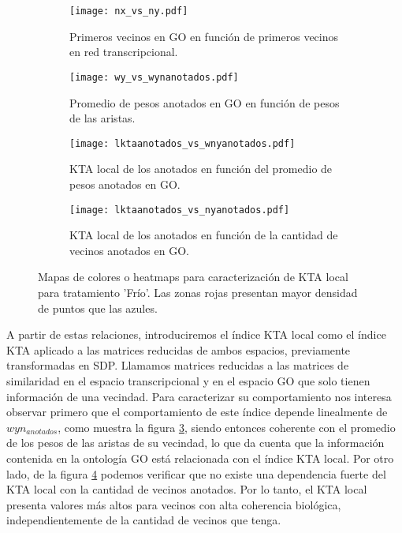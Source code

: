 \begin{sidewaysfigure}[t!]
    \centering
    \begin{subfigure}[t]{0.45\textwidth}
    \centering
    \texttt{[image: nx\_vs\_ny.pdf]}
    \caption{Primeros vecinos en GO en función de primeros vecinos en red transcripcional.}
    \label{fig:nx_vs_ny}
    \end{subfigure}    
    \begin{subfigure}[t]{0.45\textwidth}
    \centering
    \texttt{[image: wy\_vs\_wynanotados.pdf]}
    \caption{Promedio de pesos anotados en GO en función de pesos de las aristas.}
    \label{fig:wy_vs_wynanotados}
    \end{subfigure}    
    \begin{subfigure}[t]{0.45\textwidth}
    \centering
    \texttt{[image: lktaanotados\_vs\_wnyanotados.pdf]}
    \caption{KTA local de los anotados en función del promedio de pesos anotados en GO.}
    \label{fig:lktaanotados_vs_wnyanotados}
    \end{subfigure}    
    \begin{subfigure}[t]{0.45\textwidth}
    \centering
    \texttt{[image: lktaanotados\_vs\_nyanotados.pdf]}
    \caption{KTA local de los anotados en función de la cantidad de vecinos anotados en GO.}
    \label{fig:lktaanotados_vs_nyanotados}
    \end{subfigure}            
    \label{fig:ktalocal}
    \caption{Mapas de colores o heatmaps para caracterización de KTA local para tratamiento 'Frío'. Las zonas rojas presentan mayor densidad de puntos que las azules.}
\end{sidewaysfigure}

A partir de estas relaciones, introduciremos el índice KTA local como el índice KTA aplicado a las matrices reducidas de ambos espacios, previamente transformadas en SDP. Llamamos matrices reducidas a las matrices de similaridad en el espacio transcripcional y en el espacio GO que solo tienen información de una vecindad. Para caracterizar su comportamiento nos interesa observar primero que el comportamiento de este índice depende linealmente de $wyn_{anotados}$, como muestra la figura \ref{fig:lktaanotados_vs_wnyanotados}, siendo entonces coherente con el promedio de los pesos de las aristas de su vecindad, lo que da cuenta que la información contenida en la ontología GO está relacionada con el índice KTA local. Por otro lado, de la figura \ref{fig:lktaanotados_vs_nyanotados} podemos verificar que no existe una dependencia fuerte del KTA local con la cantidad de vecinos anotados. Por lo tanto, el KTA local presenta valores más altos para vecinos con alta coherencia biológica, independientemente de la cantidad de vecinos que tenga.
